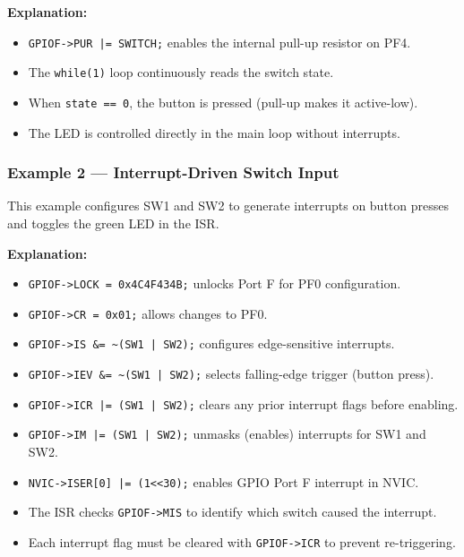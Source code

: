 

\noindent
\textbf{Explanation:}
\begin{itemize}[nosep]
  \item \texttt{GPIOF->PUR |= SWITCH;} enables the internal pull-up resistor on PF4.
  \item The \texttt{while(1)} loop continuously reads the switch state.
  \item When \texttt{state == 0}, the button is pressed (pull-up makes it active-low).
  \item The LED is controlled directly in the main loop without interrupts.
\end{itemize}
\newpage
\subsubsection{Example 2 — Interrupt-Driven Switch Input}

This example configures SW1 and SW2 to generate interrupts on button presses and toggles the green LED in the ISR.



\noindent
\textbf{Explanation:}
\begin{itemize}[nosep]
  \item \texttt{GPIOF->LOCK = 0x4C4F434B;} unlocks Port F for PF0 configuration.
  \item \texttt{GPIOF->CR = 0x01;} allows changes to PF0.
  \item \texttt{GPIOF->IS \&= \textasciitilde(SW1 | SW2);} configures edge-sensitive interrupts.
  \item \texttt{GPIOF->IEV \&= \textasciitilde(SW1 | SW2);} selects falling-edge trigger (button press).
  \item \texttt{GPIOF->ICR |= (SW1 | SW2);} clears any prior interrupt flags before enabling.
  \item \texttt{GPIOF->IM |= (SW1 | SW2);} unmasks (enables) interrupts for SW1 and SW2.
  \item \texttt{NVIC->ISER[0] |= (1<<30);} enables GPIO Port F interrupt in NVIC.
  \item The ISR checks \texttt{GPIOF->MIS} to identify which switch caused the interrupt.
  \item Each interrupt flag must be cleared with \texttt{GPIOF->ICR} to prevent re-triggering.
\end{itemize}
\newpage
